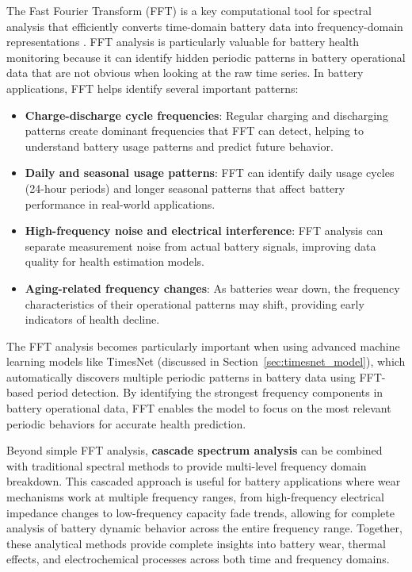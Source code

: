 The Fast Fourier Transform (FFT) is a key computational tool for spectral analysis that efficiently converts time-domain battery data into frequency-domain representations \cite{chae_state--health_2025}. FFT analysis is particularly valuable for battery health monitoring because it can identify hidden periodic patterns in battery operational data that are not obvious when looking at the raw time series. In battery applications, FFT helps identify several important patterns:

\begin{itemize}
\item \textbf{Charge-discharge cycle frequencies}: Regular charging and discharging patterns create dominant frequencies that FFT can detect, helping to understand battery usage patterns and predict future behavior.
\item \textbf{Daily and seasonal usage patterns}: FFT can identify daily usage cycles (24-hour periods) and longer seasonal patterns that affect battery performance in real-world applications.
\item \textbf{High-frequency noise and electrical interference}: FFT analysis can separate measurement noise from actual battery signals, improving data quality for health estimation models.
\item \textbf{Aging-related frequency changes}: As batteries wear down, the frequency characteristics of their operational patterns may shift, providing early indicators of health decline.
\end{itemize}


The FFT analysis becomes particularly important when using advanced machine learning models like TimesNet (discussed in Section~\ref{sec:timesnet_model}), which automatically discovers multiple periodic patterns in battery data using FFT-based period detection. By identifying the strongest frequency components in battery operational data, FFT enables the model to focus on the most relevant periodic behaviors for accurate health prediction.

Beyond simple FFT analysis, \textbf{cascade spectrum analysis} can be combined with traditional spectral methods to provide multi-level frequency domain breakdown. This cascaded approach is useful for battery applications where wear mechanisms work at multiple frequency ranges, from high-frequency electrical impedance changes to low-frequency capacity fade trends, allowing for complete analysis of battery dynamic behavior across the entire frequency range. Together, these analytical methods provide complete insights into battery wear, thermal effects, and electrochemical processes across both time and frequency domains.


